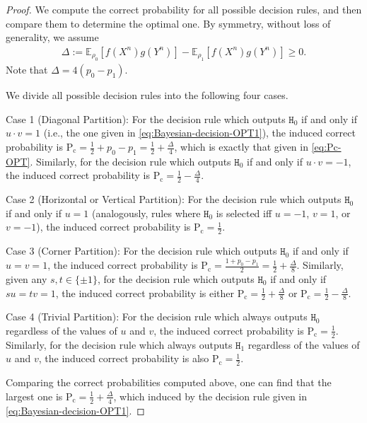 \documentclass[journal,draftcls, onecolumn]{IEEEtran}
\newcommand{\rom}[1]{\mathrm{#1}}
\newcommand{\Pc}{\rom{P}_{\rom{c}}}
\begin{document}
\begin{proof}
We compute the correct probability for all possible decision rules, and then compare them to determine the optimal one. 
By symmetry, without loss of generality, we assume 
\begin{align}
\Delta:=\mathbb{E}_{\rho_{0}}[f(X^{n})g(Y^{n})] - \mathbb{E}_{\rho_{1}}[f(X^{n})g(Y^{n})] \ge 0. 
\end{align}
Note that $\Delta= 4 (p_0 -p_1)$.

We divide all possible decision rules into the following four cases. 

Case 1 (Diagonal Partition): For the decision rule   which outputs  $\mathtt{H}_0$ if and only if $u\cdot v = 1$ (i.e., the one  
given in  \eqref{eq:Bayesian-decision-OPT1}),
the  induced correct probability is 
$\Pc = \frac{1}{2} + p_0 - p_1 = \frac{1}{2} + \frac{\Delta}{4}$, 
which is exactly that given in \eqref{eq:Pc-OPT}. 
Similarly, for the decision rule  which outputs  $\mathtt{H}_0$ if and only if $u\cdot v = -1$, 
the  induced correct probability is 
$\Pc = \frac{1}{2} - \frac{\Delta}{4}$. 

Case 2 (Horizontal or Vertical Partition): For the decision rule which outputs \(\mathtt{H}_0\) if and only if \(u = 1\) (analogously, rules where \(\mathtt{H}_0\) is selected iff \(u=-1\), \(v=1\), or \(v=-1\)),
the induced correct probability is  
$\Pc = \frac{1}{2}$. 

Case 3 (Corner Partition): For the decision rule which outputs \(\mathtt{H}_0\) if and only if \(u = v= 1\), 
the  induced correct probability is  
$\Pc = \frac{1+ p_0 - p_1}{2}  = \frac{1}{2} + \frac{\Delta}{8}$.
Similarly,   given any $s,t\in \{\pm 1\}$, for the decision rule which outputs $\mathtt{H}_0$ if and only if $s u = t v = 1$, the  induced correct probability is either  
$\Pc = \frac{1}{2} + \frac{\Delta}{8}$ or $\Pc = \frac{1}{2} - \frac{\Delta}{8}$. 

Case 4 (Trivial Partition): For the decision rule which always outputs \(\mathtt{H}_0\) regardless of the values of $u$ and $v$,
the  induced correct probability is  
$\Pc = \frac{1}{2}$.
Similarly,  for the decision rule which always outputs \(\mathtt{H}_1\) regardless of the values of $u$ and $v$,
the  induced correct probability is  also 
$\Pc = \frac{1}{2}$.

Comparing the correct probabilities computed above, one can find that the largest one is $\Pc =  \frac{1}{2} + \frac{\Delta}{4}$, which induced by the  decision rule
given in  \eqref{eq:Bayesian-decision-OPT1}. 
\end{proof}
\end{document}
